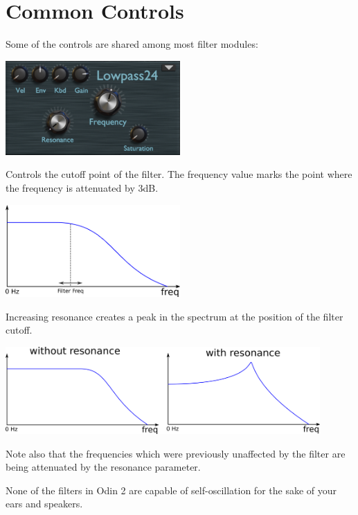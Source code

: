 \section{Common Controls}
Some of the controls are shared among most filter modules:

\begin{center}
    \includegraphics[width=0.5\textwidth]{graphics/lowpass_filter.png}
\end{center}

{Controls the cutoff point of the filter. The frequency value marks the point where the frequency is attenuated by 3dB.

    \begin{center}
        \includegraphics[width=0.5\textwidth]{graphics/filter_freq.png}
    \end{center}
}

{Increasing resonance creates a peak in the spectrum at the position of the filter cutoff.

    \begin{center}
        \includegraphics[width=0.9\textwidth]{graphics/filter_resonance.png}
    \end{center}

    Note also that the frequencies which were previously unaffected by the filter are being attenuated by the resonance parameter.

    None of the filters in Odin 2 are capable of self-oscillation for the sake of your ears and speakers.}

